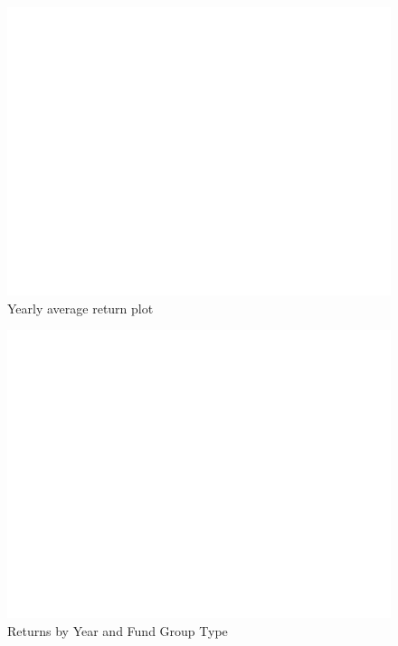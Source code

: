 \documentclass{article}
\begin{document}
\begin{figure}[h]
    \centering
    \includegraphics{../data/manual/histogram.png}
    \caption{Yearly average return plot}
    \label{fig:image1}
\end{figure}


\begin{figure}[h]
    \centering
    \includegraphics{../data/manual/histogram_mret_per_code.png}
    \caption{Returns by Year and Fund Group Type}
    \label{fig:image2}
\end{figure}
\end{document}
